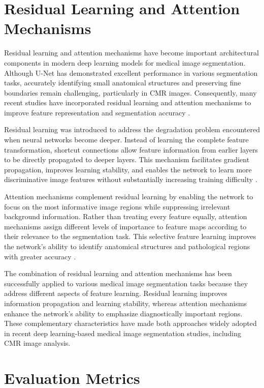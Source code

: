 \section{Residual Learning and Attention Mechanisms}
\label{sec:residual-attention}

Residual learning and attention mechanisms have become important architectural components in modern deep learning models for medical image segmentation. Although U-Net has demonstrated excellent performance in various segmentation tasks, accurately identifying small anatomical structures and preserving fine boundaries remain challenging, particularly in CMR images. Consequently, many recent studies have incorporated residual learning and attention mechanisms to improve feature representation and segmentation accuracy \citep{He2016,Oktay2018,Schlemper2019}.

Residual learning was introduced to address the degradation problem encountered when neural networks become deeper. Instead of learning the complete feature transformation, shortcut connections allow feature information from earlier layers to be directly propagated to deeper layers. This mechanism facilitates gradient propagation, improves learning stability, and enables the network to learn more discriminative image features without substantially increasing training difficulty \citep{He2016}.

Attention mechanisms complement residual learning by enabling the network to focus on the most informative image regions while suppressing irrelevant background information. Rather than treating every feature equally, attention mechanisms assign different levels of importance to feature maps according to their relevance to the segmentation task. This selective feature learning improves the network's ability to identify anatomical structures and pathological regions with greater accuracy \citep{Oktay2018,Woo2018}.

The combination of residual learning and attention mechanisms has been successfully applied to various medical image segmentation tasks because they address different aspects of feature learning. Residual learning improves information propagation and learning stability, whereas attention mechanisms enhance the network's ability to emphasize diagnostically important regions. These complementary characteristics have made both approaches widely adopted in recent deep learning-based medical image segmentation studies, including CMR image analysis.

\section{Evaluation Metrics}
\label{sec:evaluation-metrics}

